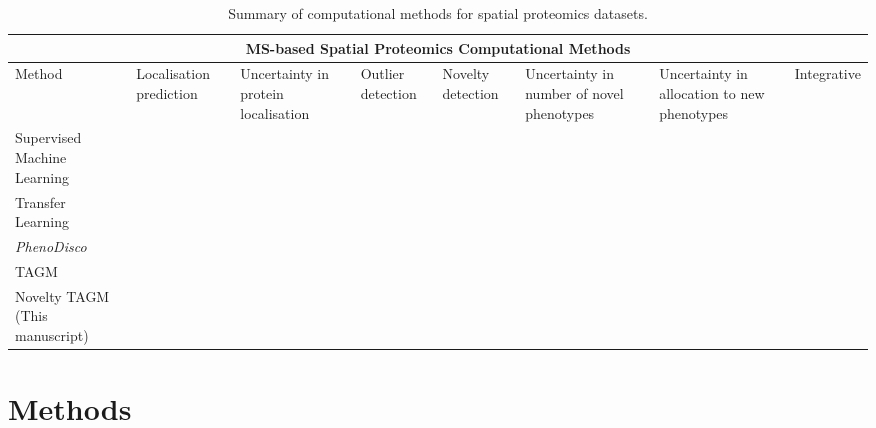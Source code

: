 \documentclass[12pt,english]{article}
\newcommand{\xmark}{\ding{55}}
\begin{document}
\begin{table}[h]
	\centering
	\footnotesize
	\hspace*{-1.5cm}
	\begin{tabular}{ |p{2.5cm}|p{2cm}|p{2cm}|p{1.5cm}|p{2cm}|p{2cm}|p{2cm}|p{2cm}|  }
		\hline
		\multicolumn{8}{|c|}{MS-based Spatial Proteomics Computational Methods} \\
		\hline
		Method & Localisation prediction & Uncertainty in protein localisation & Outlier detection  & Novelty detection & Uncertainty in number of novel phenotypes & Uncertainty in allocation to new phenotypes & Integrative \\
		\hline
		\hline
		Supervised Machine Learning\citep{Gatto:2014b}  & \vfill\hfil \checkmark & \vfill\hfil\xmark & \vfill\hfil\xmark &\vfill\hfil\xmark&\vfill\hfil\xmark&\vfill\hfil\xmark& \vfill\hfil\xmark\\
		\hline
		Transfer Learning \citep{Breckels:2016}  & \vfill\hfil \checkmark  & \vfill\hfil\xmark& \vfill\hfil\xmark &\vfill\hfil\xmark&\vfill\hfil\xmark& \vfill\hfil\xmark&\vfill\hfil \checkmark\\
		\hline
		\textit{PhenoDisco} \citep{Breckels:2013}  & \vfill\hfil\xmark &\vfill\hfil\xmark &\vfill\hfil \checkmark &\vfill\hfil \checkmark&\vfill\hfil\xmark&\vfill\hfil\xmark& \vfill\hfil\xmark\\
		\hline
		TAGM \citep{Crook:2018}& \vfill\hfil \checkmark & \vfill\hfil \checkmark & \vfill\hfil \checkmark& \vfill\hfil\xmark&\vfill\hfil\xmark&\vfill\hfil\xmark&\vfill\hfil\xmark\\
		\hline
		Novelty TAGM (This manuscript)&  \vfill\hfil \checkmark & \vfill\hfil \checkmark &\vfill\hfil \checkmark & \vfill\hfil \checkmark&\vfill\hfil \checkmark&\vfill\hfil \checkmark& \vfill\hfil\xmark\\
		\hline
		\hline
	\end{tabular}
	\caption{Summary of computational methods for spatial  proteomics datasets.}
	\label{table:methods}
\end{table}


\section{Methods}
\end{document}
